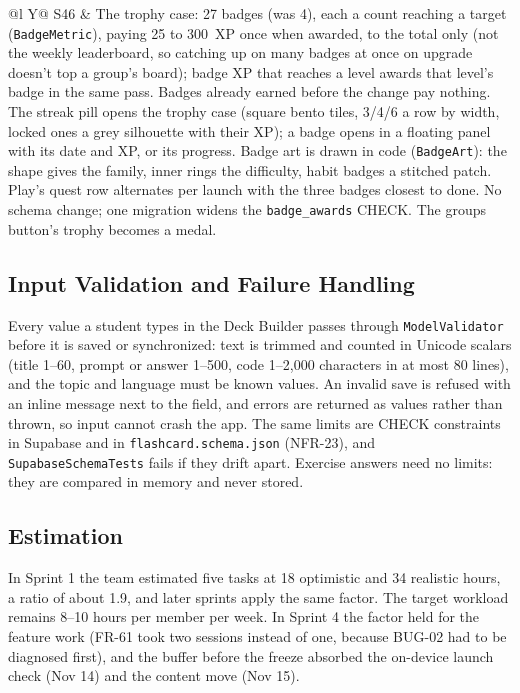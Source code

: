 \documentclass[12pt,letterpaper]{article}
\begin{document}
\begin{xltabular}{\textwidth}{@{}l Y@{}}
S46 & The trophy case: 27 badges (was 4), each a count reaching a target (\texttt{BadgeMetric}), paying 25 to 300~XP once when awarded, to the total only (not the weekly leaderboard, so catching up on many badges at once on upgrade doesn't top a group's board); badge XP that reaches a level awards that level's badge in the same pass. Badges already earned before the change pay nothing. The streak pill opens the trophy case (square bento tiles, 3/4/6 a row by width, locked ones a grey silhouette with their XP); a badge opens in a floating panel with its date and XP, or its progress. Badge art is drawn in code (\texttt{BadgeArt}): the shape gives the family, inner rings the difficulty, habit badges a stitched patch. Play's quest row alternates per launch with the three badges closest to done. No schema change; one migration widens the \texttt{badge\_awards} CHECK. The groups button's trophy becomes a medal. \\
\end{xltabular}

\subsection{Input Validation and Failure Handling}
Every value a student types in the Deck Builder passes through
\texttt{ModelValidator} before it is saved or synchronized: text is trimmed and
counted in Unicode scalars (title 1--60, prompt or answer 1--500, code 1--2,000
characters in at most 80 lines), and the topic and language must be known values.
An invalid save is refused with an inline message next to the field, and errors are
returned as values rather than thrown, so input cannot crash the app. The same limits
are CHECK constraints in Supabase and in \texttt{flashcard.schema.json} (NFR-23), and
\texttt{SupabaseSchemaTests} fails if they drift apart. Exercise answers need no
limits: they are compared in memory and never stored.

\subsection{Estimation}
In Sprint 1 the team estimated five tasks at 18 optimistic and 34 realistic hours, a
ratio of about 1.9, and later sprints apply the same factor. The target workload
remains 8--10 hours per member per week. In Sprint 4 the factor held for the
feature work (FR-61 took two sessions instead of one, because BUG-02 had to be
diagnosed first), and the buffer before the freeze absorbed the on-device launch
check (Nov 14) and the content move (Nov 15).
\end{document}
